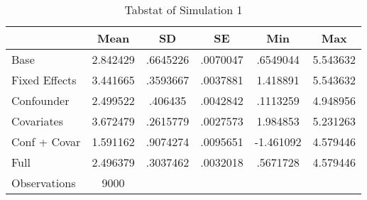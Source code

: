 \begin{table}[htbp]\centering
\def\sym#1{\ifmmode^{#1}\else\(^{#1}\)\fi}
\caption{Tabstat of Simulation 1}
\begin{tabular}{l*{1}{ccccc}}
\hline\hline
                    &        Mean&          SD&          SE&         Min&         Max\\
\hline
Base                &    2.842429&    .6645226&    .0070047&    .6549044&    5.543632\\
Fixed Effects       &    3.441665&    .3593667&    .0037881&    1.418891&    5.543632\\
Confounder          &    2.499522&     .406435&    .0042842&    .1113259&    4.948956\\
Covariates          &    3.672479&    .2615779&    .0027573&    1.984853&    5.231263\\
Conf + Covar        &    1.591162&    .9074274&    .0095651&   -1.461092&    4.579446\\
Full                &    2.496379&    .3037462&    .0032018&    .5671728&    4.579446\\
\hline
Observations        &        9000&            &            &            &            \\
\hline\hline
\end{tabular}
\end{table}
